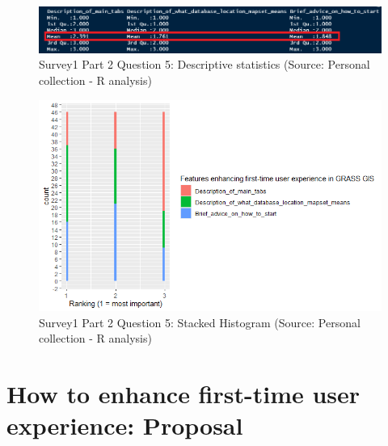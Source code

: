 \documentclass[a4paper,10pt,twoside]{article}
\begin{document}
\vspace{0.3cm}
\begin{figure}[hbt!] 
\begin{center}
\includegraphics[width=17cm]{../surveys/analyzed_data/survey1_part2_question5_stats.png} 
\caption[Survey1 Part 2 Question 5: Descriptive statistics]{Survey1 Part 2 Question 5: Descriptive statistics (Source: Personal collection - R analysis)}
\label{fig:survey1_part2_question5_stats}
\end{center}
\end{figure}

\vspace{0.3cm}
\begin{figure}[hbt!] 
\begin{center}
\includegraphics[width=15cm]{../surveys/analyzed_data/survey1_part2_question5_histogram_r.png} 
\caption[Survey1 Part 2 Question 5: Stacked Histogram]{Survey1 Part 2 Question 5: Stacked Histogram (Source: Personal collection - R analysis)}
\label{fig:survey1_part2_question5_histogram_r}
\end{center}
\end{figure}


\newpage
\vspace*{-1cm}
\section{How to enhance first-time user experience: Proposal}
\label{sec:proposal1}
\end{document}
